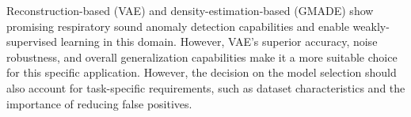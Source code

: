 Reconstruction-based (VAE) and density-estimation-based (GMADE) show promising respiratory sound anomaly detection capabilities and enable weakly-supervised learning in this domain. However, VAE's superior accuracy, noise robustness, and overall generalization capabilities make it a more suitable choice for this specific application. However, the decision on the model selection should also account for task-specific requirements, such as dataset characteristics and the importance of reducing false positives. 
